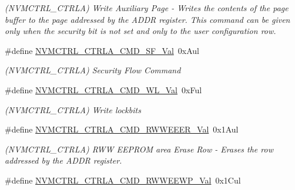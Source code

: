 \begin{DoxyCompactItemize}
\begin{DoxyCompactList}\small\item\em (N\+V\+M\+C\+T\+R\+L\+\_\+\+C\+T\+R\+L\+A) Write Auxiliary Page -\/ Writes the contents of the page buffer to the page addressed by the A\+D\+D\+R register. This command can be given only when the security bit is not set and only to the user configuration row. \end{DoxyCompactList}\item 
\hypertarget{group___s_a_m_l21___n_v_m_c_t_r_l_ga37bc89b225c1b5d5a07bc707ef910ecb}{}\#define \hyperlink{group___s_a_m_l21___n_v_m_c_t_r_l_ga37bc89b225c1b5d5a07bc707ef910ecb}{N\+V\+M\+C\+T\+R\+L\+\_\+\+C\+T\+R\+L\+A\+\_\+\+C\+M\+D\+\_\+\+S\+F\+\_\+\+Val}~0x\+Aul\label{group___s_a_m_l21___n_v_m_c_t_r_l_ga37bc89b225c1b5d5a07bc707ef910ecb}

\begin{DoxyCompactList}\small\item\em (N\+V\+M\+C\+T\+R\+L\+\_\+\+C\+T\+R\+L\+A) Security Flow Command \end{DoxyCompactList}\item 
\hypertarget{group___s_a_m_l21___n_v_m_c_t_r_l_ga16cd33731304aa0ed2db58be2f6fe599}{}\#define \hyperlink{group___s_a_m_l21___n_v_m_c_t_r_l_ga16cd33731304aa0ed2db58be2f6fe599}{N\+V\+M\+C\+T\+R\+L\+\_\+\+C\+T\+R\+L\+A\+\_\+\+C\+M\+D\+\_\+\+W\+L\+\_\+\+Val}~0x\+Ful\label{group___s_a_m_l21___n_v_m_c_t_r_l_ga16cd33731304aa0ed2db58be2f6fe599}

\begin{DoxyCompactList}\small\item\em (N\+V\+M\+C\+T\+R\+L\+\_\+\+C\+T\+R\+L\+A) Write lockbits \end{DoxyCompactList}\item 
\hypertarget{group___s_a_m_l21___n_v_m_c_t_r_l_ga0e738a1a6d1d0bce5caad7fce29f2e18}{}\#define \hyperlink{group___s_a_m_l21___n_v_m_c_t_r_l_ga0e738a1a6d1d0bce5caad7fce29f2e18}{N\+V\+M\+C\+T\+R\+L\+\_\+\+C\+T\+R\+L\+A\+\_\+\+C\+M\+D\+\_\+\+R\+W\+W\+E\+E\+E\+R\+\_\+\+Val}~0x1\+Aul\label{group___s_a_m_l21___n_v_m_c_t_r_l_ga0e738a1a6d1d0bce5caad7fce29f2e18}

\begin{DoxyCompactList}\small\item\em (N\+V\+M\+C\+T\+R\+L\+\_\+\+C\+T\+R\+L\+A) R\+W\+W E\+E\+P\+R\+O\+M area Erase Row -\/ Erases the row addressed by the A\+D\+D\+R register. \end{DoxyCompactList}\item 
\hypertarget{group___s_a_m_l21___n_v_m_c_t_r_l_ga6cbdf6599c74676de89836531389b7f1}{}\#define \hyperlink{group___s_a_m_l21___n_v_m_c_t_r_l_ga6cbdf6599c74676de89836531389b7f1}{N\+V\+M\+C\+T\+R\+L\+\_\+\+C\+T\+R\+L\+A\+\_\+\+C\+M\+D\+\_\+\+R\+W\+W\+E\+E\+W\+P\+\_\+\+Val}~0x1\+Cul\label{group___s_a_m_l21___n_v_m_c_t_r_l_ga6cbdf6599c74676de89836531389b7f1}


\end{DoxyCompactItemize}

